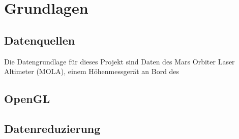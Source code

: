 \chapter{Grundlagen}

\section{Datenquellen}
Die Datengrundlage für dieses Projekt sind Daten des Mars Orbiter Laser Altimeter (MOLA), einem Höhenmessgerät an Bord des 
               




\section{OpenGL}

\section{Datenreduzierung}

